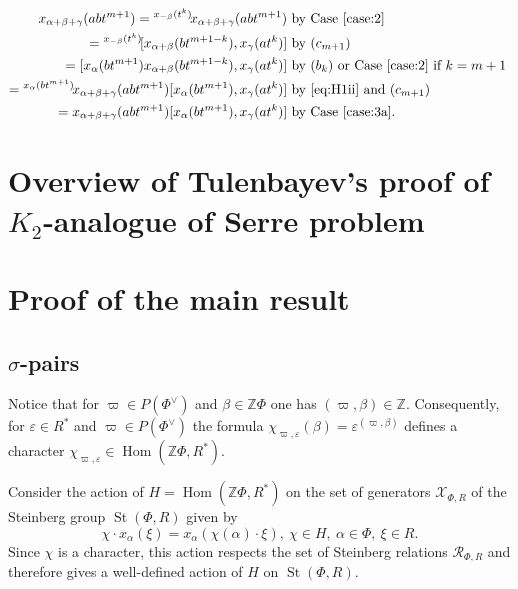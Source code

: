 \documentclass[oneside, 10pt]{amsart}
\DeclareMathOperator{\St}{St}
\DeclareMathOperator{\Hom}{Hom}
\newcommand{\ZZ}{\mathbb{Z}}
\numberwithin{equation}{section}
\numberwithin{lemma}{section}
\theoremstyle{definition}
\theoremstyle{remark}
\begin{document}
\begin{enumerate}
\begin{enumerate}
\begin{align*}
 x_{\alpha+\beta+\gamma}(abt^{m+1}) = {}^{x_{-\beta}(t^k)}\!x_{\alpha+\beta+\gamma}(abt^{m+1}) & \text{ by Case~\eqref{case:2}}\\
 = {}^{x_{-\beta}(t^k)}\![x_{\alpha+\beta}(bt^{m+1-k}), x_\gamma(at^k)] & \text{ by $(c_{m+1})$} \\
 = [x_{\alpha}(bt^{m+1}) x_{\alpha+\beta}(bt^{m+1-k}), x_\gamma(at^k)] & \text{ by $(b_k)$ or Case~\eqref{case:2} if $k=m+1$ }\\
 = {}^{x_{\alpha}(bt^{m+1})}\!x_{\alpha+\beta+\gamma}(abt^{m+1}) [x_{\alpha}(bt^{m+1}), x_\gamma(at^k)] & \text{ by~\eqref{eq:H1ii} and $(c_{m+1})$} \\
 = x_{\alpha+\beta+\gamma}(abt^{m+1}) [x_{\alpha}(bt^{m+1}), x_\gamma(at^k)] & \text{ by Case~\eqref{case:3a}.}
\end{align*}
\end{enumerate}
\end{enumerate}


\section{Overview of Tulenbayev's proof of $K_2$-analogue of Serre problem}

\section{Proof of the main result}

\subsection{$\sigma$-pairs}
Notice that for $\varpi \in P(\Phi^\vee)$ and $\beta \in \ZZ \Phi$ one has $(\varpi, \beta) \in \ZZ $.
Consequently, for $\varepsilon \in R^*$ and $\varpi \in P(\Phi^\vee)$ the formula $\chi_{\varpi, \varepsilon}(\beta) = \varepsilon ^ {(\varpi, \beta)}$
defines a character $\chi_{\varpi, \varepsilon} \in \Hom(\ZZ \Phi, R^*)$.

Consider the action of $H=\Hom(\ZZ \Phi, R^*)$ on the set of generators $\mathcal{X}_{\Phi, R}$ of the Steinberg group $\St(\Phi, R)$ given by
\begin{equation} \chi \cdot x_\alpha(\xi) = x_\alpha(\chi(\alpha) \cdot \xi),\ \chi \in H,\ \alpha\in \Phi,\ \xi \in R. \end{equation}
Since $\chi$ is a character, this action respects the set of Steinberg relations $\mathcal{R}_{\Phi, R}$ and therefore gives a well-defined action of $H$ on $\St(\Phi, R)$.
\end{document}
